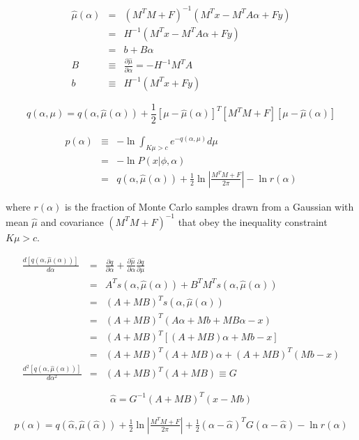 \documentclass{amsart}
\newcommand{\D}[2]{\ensuremath{\frac{d{#1}}{d{#2}}}}
\newcommand{\Dp}[2]{\ensuremath{\frac{\partial{#1}}{\partial{#2}}}}
\begin{document}
\begin{eqnarray}
  \hat{\mu}(\alpha) &=& \left(M^T\!M + F\right)^{-1}
  \left(M^T\!x - M^T\!A\alpha+ Fy\right) \\
  &=& H^{-1} \left(M^T\!x - M^T\!A\alpha + Fy\right) \\
  &=& b + B\alpha \\
  B &\equiv& \Dp{\hat{\mu}}{\alpha} =  -H^{-1}M^T\!A \\
  b &\equiv& H^{-1}\left(M^T\!x + Fy\right)
\end{eqnarray}

\begin{equation}
  q(\alpha,\mu) = q(\alpha,\hat{\mu}(\alpha)) +
  \frac{1}{2}\left[\mu-\hat{\mu}(\alpha)\right]^T\!\left[M^T\!M + F\right]
  \left[\mu-\hat{\mu}(\alpha)\right]
\end{equation}

\begin{eqnarray}
  p(\alpha) &\equiv& -\ln\int_{K\mu > c}\!\!\!\!\!\!\!\!
  e^{-q(\alpha,\mu)} d\mu \\
  &=& -\ln P(x|\phi,\alpha) \\
    &=& q(\alpha,\hat{\mu}(\alpha)) 
  + \frac{1}{2}\ln\left|\frac{M^T\!M + F}{2\pi}\right|
  - \ln r(\alpha)
\end{eqnarray}

where $r(\alpha)$ is the fraction of Monte Carlo samples drawn from a
Gaussian with mean $\hat{\mu}$ and covariance $(M^T\!M + F)^{-1}$ that
obey the inequality constraint $K\mu > c$.

\begin{eqnarray}
  \D{[q(\alpha,\hat{\mu}(\alpha))]}{\alpha} &=& \Dp{q}{\alpha} +
  \Dp{\hat{\mu}}{\alpha}\Dp{q}{\mu} \\
  &=& A^T\!s(\alpha,\hat{\mu}(\alpha)) 
  + B^T M^Ts(\alpha,\hat{\mu}(\alpha)) \\
  &=& \left(A + M B \right)^T s(\alpha,\hat{\mu}(\alpha)) \\
  &=& \left(A + M B \right)^T \left(A\alpha + Mb + M B \alpha -
  x\right) \\
  &=& \left(A + M B \right)^T \left[\left(A + M B\right)\alpha + Mb -
    x\right] \\
  &=& (A+MB)^T\!(A+MB)\alpha + (A + MB)^T\!(Mb - x)\\
  \D{^2[q(\alpha,\hat{\mu}(\alpha))]}{\alpha^2} &=& (A+MB)^T\!(A+MB) \equiv G
\end{eqnarray}

\begin{equation}
  \hat{\alpha} = G^{-1}\!(A + MB)^T\!(x - Mb)
\end{equation}

\begin{eqnarray}
  p(\alpha) = q(\hat{\alpha},\hat{\mu}(\hat{\alpha}))
  + \frac{1}{2}\ln\left|\frac{M^T\!M + F}{2\pi}\right|
  + \frac{1}{2}\left(\alpha - \hat{\alpha}\right)^T\!
  G \left(\alpha - \hat{\alpha}\right)
  - \ln r(\alpha)
\end{eqnarray}
\end{document}
